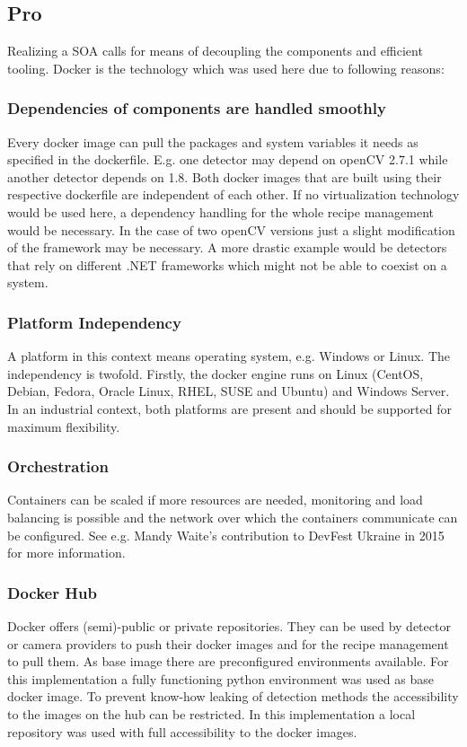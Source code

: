 \subsection{Pro}
Realizing a SOA calls for means of decoupling the components and efficient tooling. Docker is the technology which was used here due to following reasons:
\subsubsection{Dependencies of components are handled smoothly} 
Every docker image can pull the packages and system variables it needs as specified in the dockerfile. E.g. one detector may depend on openCV 2.7.1 while another detector depends on 1.8. Both docker images that are built using their respective dockerfile are independent of each other. If no virtualization technology would be used here, a dependency handling for the whole recipe management would be necessary. In the case of two openCV versions just a slight modification of the framework may be necessary. A more drastic example would be detectors that rely on different .NET frameworks which might not be able to coexist on a system.
\subsubsection{Platform Independency}
 A platform in this context means operating system, e.g. Windows or Linux. The independency is twofold. Firstly, the docker engine runs on Linux (CentOS, Debian, Fedora, Oracle Linux, RHEL, SUSE and Ubuntu) and Windows Server. In an industrial context, both platforms are present and should be supported for maximum flexibility.
\subsubsection{Orchestration}
 Containers can be scaled if more resources are needed, monitoring and load balancing is possible and the network over which the containers communicate can be configured. See e.g. Mandy Waite's contribution to DevFest Ukraine in 2015 for more information. \cite{Waite2015ScalableContainers}
\subsubsection{Docker Hub}
 Docker offers (semi)-public or private repositories. They can be used by detector or camera providers to push their docker images and for the recipe management to pull them. As base image there are preconfigured environments available. For this implementation a fully functioning python environment was used as base docker image. To prevent know-how leaking of detection methods the accessibility to the images on the hub can be restricted. In this implementation a local repository was used with full accessibility to the docker images.
